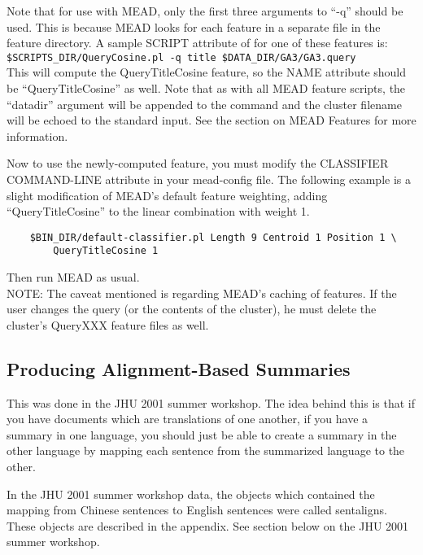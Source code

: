 \documentclass[10pt]{article}
\begin{document}
Note that for use with MEAD, only the first three 
arguments to ``-q''
should be used.  This is because MEAD
looks for each feature in a separate file in the
feature directory.  A sample SCRIPT attribute of
for one of these features is:\\

    \verb|$SCRIPTS_DIR/QueryCosine.pl -q title $DATA_DIR/GA3/GA3.query|\\

This will compute the QueryTitleCosine feature,
so the NAME attribute should be ``QueryTitleCosine''
as well.
Note that as with all MEAD feature scripts, 
the ``datadir'' argument will be appended
to the command and the cluster filename will be
echoed to the standard input.  See the section on 
MEAD Features for more information.

Now to use the newly-computed feature, you must 
modify the CLASSIFIER COMMAND-LINE attribute in
your mead-config file.  The following example is a slight
modification of MEAD's default feature weighting, adding
``QueryTitleCosine'' to the linear combination with weight 1.

\begin{verbatim}
    $BIN_DIR/default-classifier.pl Length 9 Centroid 1 Position 1 \
        QueryTitleCosine 1
\end{verbatim}

\noindent
Then run MEAD as usual.\\

NOTE: The caveat mentioned is regarding MEAD's caching
of features.  If the user changes the query (or the contents of
the cluster), he must
delete the cluster's QueryXXX feature files as
well.

\subsection{Producing Alignment-Based Summaries}


This was done in the 
JHU 2001 summer workshop.  The idea behind this is that if you have documents
which are translations of one another, if you have a summary in one language, 
you should just be able to create a summary in the other language by mapping
each sentence from the summarized language to the other.

In the JHU 2001 summer workshop data, the objects which contained the mapping
from Chinese sentences to English sentences were called 
sentaligns.  These objects are described in the appendix.  See section below on the JHU 
2001 summer workshop.
\end{document}
